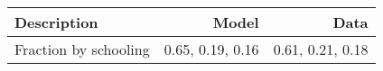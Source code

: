 \begin{tabular}{lrr}
\hline
Description & Model  & Data  \\ 
\hline
Fraction by schooling & 0.65, 0.19, 0.16  & 0.61, 0.21, 0.18  \\ 
\hline
\end{tabular}%
